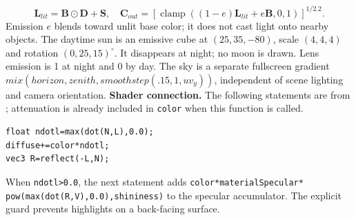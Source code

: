 \[
 \mathbf L_{lit}=\mathbf B\odot\mathbf D+\mathbf S,\quad
 \mathbf C_{out}=\left[\operatorname{clamp}((1-e)\mathbf L_{lit}+e\mathbf B,0,1)\right]^{1/2.2}.
\]
Emission $e$ blends toward unlit base color; it does not cast light onto nearby objects. The daytime sun is an emissive cube at $(25,35,-80)$, scale $(4,4,4)$ and rotation $(0,25,15)^\circ$. It disappears at night; no moon is drawn. Lens emission is 1 at night and 0 by day. The sky is a separate fullscreen gradient $mix(horizon,zenith,smoothstep(.15,1,uv_y))$, independent of scene lighting and camera orientation.
\textbf{Shader connection.} The following statements are from ; attenuation is already included in \texttt{color} when this function is called.
\begin{verbatim}
float ndotl=max(dot(N,L),0.0);
diffuse+=color*ndotl;
vec3 R=reflect(-L,N);
\end{verbatim}
When \texttt{ndotl>0.0}, the next statement adds \texttt{color*materialSpecular*}\\\texttt{pow(max(dot(R,V),0.0),shininess)} to the specular accumulator. The explicit guard prevents highlights on a back-facing surface.

